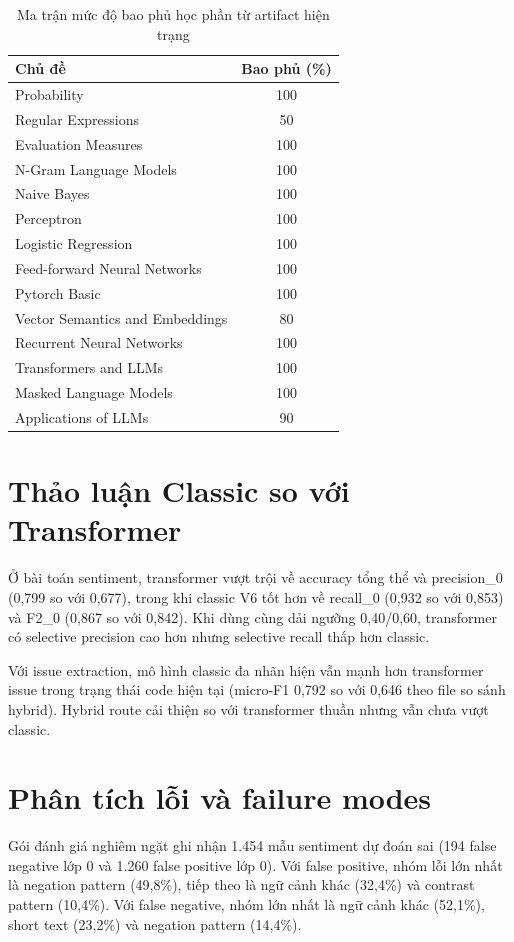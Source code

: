 ﻿\documentclass[12pt,a4paper]{article}
\begin{document}
\begin{table}[H]
\centering
\caption{Ma trận mức độ bao phủ học phần từ artifact hiện trạng}
\label{tab:course_fit_vi}
\begin{tabular}{lc}
\toprule
Chủ đề & Bao phủ (\%) \\
\midrule
Probability & 100 \\
Regular Expressions & 50 \\
Evaluation Measures & 100 \\
N-Gram Language Models & 100 \\
Naive Bayes & 100 \\
Perceptron & 100 \\
Logistic Regression & 100 \\
Feed-forward Neural Networks & 100 \\
Pytorch Basic & 100 \\
Vector Semantics and Embeddings & 80 \\
Recurrent Neural Networks & 100 \\
Transformers and LLMs & 100 \\
Masked Language Models & 100 \\
Applications of LLMs & 90 \\
\bottomrule
\end{tabular}
\end{table}

\section{Thảo luận Classic so với Transformer}
Ở bài toán sentiment, transformer vượt trội về accuracy tổng thể và precision\_0 (0,799 so với 0,677), trong khi classic V6 tốt hơn về recall\_0 (0,932 so với 0,853) và F2\_0 (0,867 so với 0,842). Khi dùng cùng dải ngưỡng 0,40/0,60, transformer có selective precision cao hơn nhưng selective recall thấp hơn classic.

Với issue extraction, mô hình classic đa nhãn hiện vẫn mạnh hơn transformer issue trong trạng thái code hiện tại (micro-F1 0,792 so với 0,646 theo file so sánh hybrid). Hybrid route cải thiện so với transformer thuần nhưng vẫn chưa vượt classic.

\section{Phân tích lỗi và failure modes}
Gói đánh giá nghiêm ngặt ghi nhận 1.454 mẫu sentiment dự đoán sai (194 false negative lớp 0 và 1.260 false positive lớp 0). Với false positive, nhóm lỗi lớn nhất là negation pattern (49,8\%), tiếp theo là ngữ cảnh khác (32,4\%) và contrast pattern (10,4\%). Với false negative, nhóm lớn nhất là ngữ cảnh khác (52,1\%), short text (23,2\%) và negation pattern (14,4\%).
\end{document}
